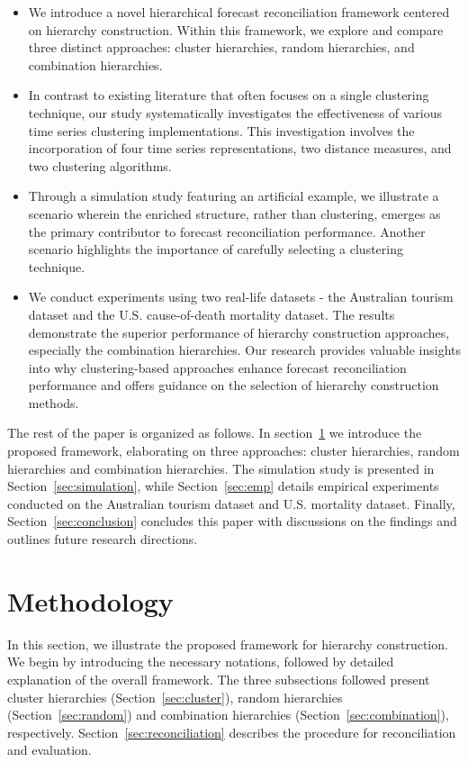 \documentclass[a4paper,review,12pt,authoryear]{elsarticle}
\begin{document}
\begin{itemize}
  \item We introduce a novel hierarchical forecast reconciliation framework centered on hierarchy construction.  Within this framework, we explore and compare three distinct approaches: cluster hierarchies, random hierarchies, and combination hierarchies.
  \item In contrast to existing literature that often focuses on a single clustering technique, our study systematically investigates the effectiveness of various time series clustering implementations. This investigation involves the incorporation of four time series representations, two distance measures, and two clustering algorithms.
  \item Through a simulation study featuring an artificial example, we illustrate a scenario wherein the enriched structure, rather than clustering, emerges as the primary contributor to forecast reconciliation performance. Another scenario highlights the importance of carefully selecting a clustering technique.
  \item We conduct experiments using two real-life datasets - the Australian tourism dataset and the U.S. cause-of-death mortality dataset. The results demonstrate the superior performance of hierarchy construction approaches, especially the combination hierarchies. Our research provides valuable insights into why clustering-based approaches enhance forecast reconciliation performance and offers guidance on the selection of hierarchy construction methods.
\end{itemize}

The rest of the paper is organized as follows. In section~\ref{sec:method} we introduce the proposed framework, elaborating on three approaches: cluster hierarchies, random hierarchies and combination hierarchies. The simulation study is presented in Section~\ref{sec:simulation}, while Section~\ref{sec:emp} details empirical experiments conducted on the Australian tourism dataset and U.S. mortality dataset. Finally, Section~\ref{sec:conclusion} concludes this paper with discussions on the findings and outlines future research directions.

\section{Methodology}
\label{sec:method}


In this section, we illustrate the proposed framework for hierarchy construction. We begin by introducing the necessary notations, followed by detailed explanation of the overall framework. The three subsections followed present cluster hierarchies (Section~\ref{sec:cluster}), random hierarchies (Section~\ref{sec:random}) and combination hierarchies (Section~\ref{sec:combination}), respectively. Section~\ref{sec:reconciliation} describes the procedure for reconciliation and evaluation. 
\end{document}
